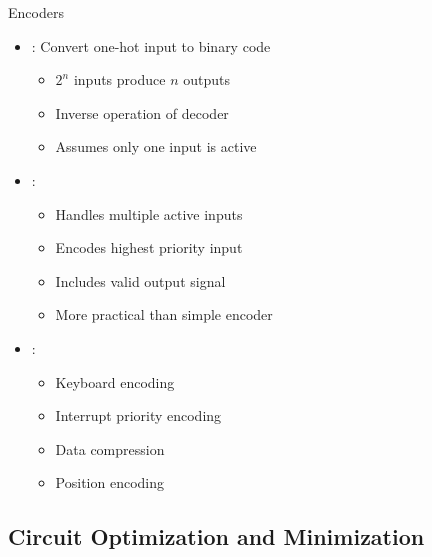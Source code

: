 \begin{frame}{Encoders}
\begin{itemize}
\item {}: Convert one-hot input to binary code
\begin{itemize}
\item $2^n$ inputs produce $n$ outputs
\item Inverse operation of decoder
\item Assumes only one input is active
\end{itemize}
\vspace{0.5cm}
\item {}:
\begin{itemize}
\item Handles multiple active inputs
\item Encodes highest priority input
\item Includes valid output signal
\item More practical than simple encoder
\end{itemize}
\vspace{0.3cm}
\item {}:
\begin{itemize}
\item Keyboard encoding
\item Interrupt priority encoding
\item Data compression
\item Position encoding
\end{itemize}
\end{itemize}
\end{frame}

\subsection{Circuit Optimization and Minimization}

